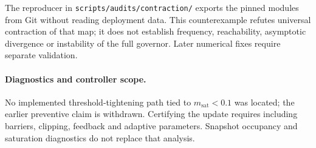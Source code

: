 \documentclass[11pt,twocolumn]{article}
\begin{document}
The reproducer in \texttt{scripts/audits/contraction/} exports
the pinned modules from Git without reading deployment data.
This counterexample refutes universal contraction of that map;
it does not establish frequency, reachability, asymptotic divergence
or instability of the full governor. Later numerical fixes
require separate validation.

\paragraph{Diagnostics and controller scope.}
No implemented threshold-tightening path tied to
$m_{\mathrm{sat}}<0.1$ was located; the earlier preventive claim
is withdrawn. Certifying the update requires including barriers,
clipping, feedback and adaptive parameters. Snapshot occupancy
and saturation diagnostics do not replace that analysis.
\end{document}
